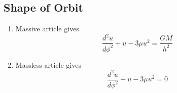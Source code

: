 \documentclass[12pt,a4paper]{article}
\begin{document}
\subsection{Shape of Orbit}
    \begin{enumerate}
        \item Massive article gives
        \begin{equation}
            \frac{d^2 u}{d\phi^2} + u -3 \mu u^2 = \frac{GM}{h^2}
        \end{equation}
        \item Massless article gives
        \begin{equation}
            \frac{d^2 u}{d\phi^2} + u -3 \mu u^2 = 0
        \end{equation}
    \end{enumerate}
\end{document}
